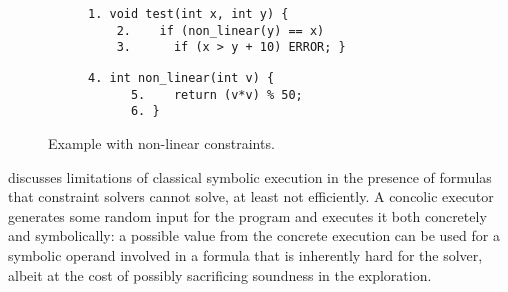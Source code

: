 \begin{figure}[t]
  \begin{center}
  \begin{subfigure}{.43\textwidth}
    \vspace{0mm}
    \begin{lstlisting}[basicstyle=\ttfamily\scriptsize]
    1. void test(int x, int y) {
    2.    if (non_linear(y) == x) 
    3.      if (x > y + 10) ERROR; }
    \end{lstlisting}
  \end{subfigure}%
    \begin{subfigure}{.43\textwidth}
    \begin{lstlisting}[basicstyle=\ttfamily\scriptsize]
      4. int non_linear(int v) {
      5.    return (v*v) % 50;
      6. }
    \end{lstlisting}
  \end{subfigure}%
  \end{center}
  \vspace{-4.0mm}
  \caption{Example with non-linear constraints.}
  \label{fi:non-linear-constraints}
  \vspace{-2mm}
\end{figure}


\cite{CS-CACM13} discusses limitations of classical symbolic execution in the presence of formulas that constraint solvers cannot solve, at least not efficiently. A concolic executor generates some random input for the program and executes it both concretely and symbolically: a possible value from the concrete execution can be used for a symbolic operand involved in a formula that is inherently hard for the solver, albeit at the cost of possibly sacrificing soundness in the exploration. 



